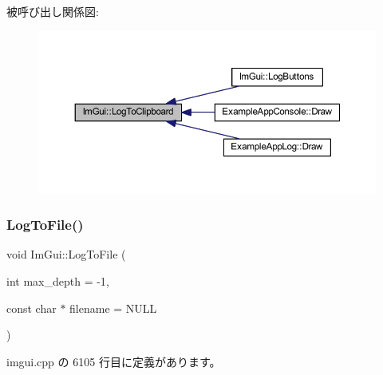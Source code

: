 被呼び出し関係図\+:\nopagebreak
\begin{figure}[H]
\begin{center}
\leavevmode
\includegraphics[width=350pt]{namespace_im_gui_a81add991d176834b8a6e315dfc78e4f7_icgraph}
\end{center}
\end{figure}
\mbox{\label{namespace_im_gui_ab62461a65c153b9f40842debef8aa755}} 
\subsubsection{\texorpdfstring{Log\+To\+File()}{LogToFile()}}
{\footnotesize\ttfamily void Im\+Gui\+::\+Log\+To\+File (\begin{DoxyParamCaption}\item[{int}]{max\+\_\+depth = {\ttfamily -\/1},  }\item[{const char $\ast$}]{filename = {\ttfamily NULL} }\end{DoxyParamCaption})}



 imgui.\+cpp の 6105 行目に定義があります。

